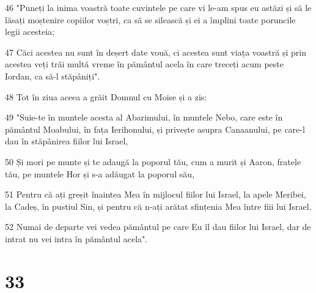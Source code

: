 \par 46 "Puneți la inima voastră toate cuvintele pe care vi le-am spus eu astăzi și să le lăsați moștenire copiilor voștri, ca să se silească și ei a împlini toate poruncile legii acesteia;
\par 47 Căci acestea nu sunt în deșert date vouă, ci acestea sunt viața voastră și prin acestea veți trăi multă vreme în pământul acela în care treceți acum peste Iordan, ca să-l stăpâniți".
\par 48 Tot în ziua aceea a grăit Domnul cu Moise și a zis:
\par 49 "Suie-te în muntele acesta al Abarimului, în muntele Nebo, care este în pământul Moabului, în fața Ierihonului, și privește asupra Canaanului, pe care-l dau în stăpânirea fiilor lui Israel,
\par 50 Și mori pe munte și te adaugă la poporul tău, cum a murit și Aaron, fratele tău, pe muntele Hor și s-a adăugat la poporul său,
\par 51 Pentru că ați greșit înaintea Mea în mijlocul fiilor lui Israel, la apele Meribei, la Cadeș, în pustiul Sin, și pentru că n-ați arătat sfințenia Mea între fiii lui Israel.
\par 52 Numai de departe vei vedea pământul pe care Eu îl dau fiilor lui Israel, dar de intrat nu vei intra în pământul acela".

\chapter{33}


